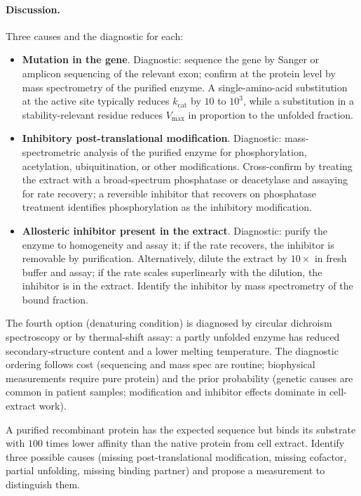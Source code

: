 \paragraph{Discussion.}
Three causes and the diagnostic for each:
\begin{itemize}[leftmargin=*]
\item \textbf{Mutation in the gene}. Diagnostic: sequence the gene by
  Sanger or amplicon sequencing of the relevant exon; confirm at the
  protein level by mass spectrometry of the purified enzyme. A
  single-amino-acid substitution at the active site typically
  reduces $k_{\text{cat}}$ by $10$ to $10^3$, while a substitution
  in a stability-relevant residue reduces $V_{\max}$ in proportion
  to the unfolded fraction.
\item \textbf{Inhibitory post-translational modification}. Diagnostic:
  mass-spectrometric analysis of the purified enzyme for
  phosphorylation, acetylation, ubiquitination, or other
  modifications. Cross-confirm by treating the extract with a
  broad-spectrum phosphatase or deacetylase and assaying for rate
  recovery; a reversible inhibitor that recovers on phosphatase
  treatment identifies phosphorylation as the inhibitory modification.
\item \textbf{Allosteric inhibitor present in the extract}.
  Diagnostic: purify the enzyme to homogeneity and assay it; if the
  rate recovers, the inhibitor is removable by purification.
  Alternatively, dilute the extract by $10\times$ in fresh buffer
  and assay; if the rate scales superlinearly with the dilution,
  the inhibitor is in the extract. Identify the inhibitor by mass
  spectrometry of the bound fraction.
\end{itemize}
The fourth option (denaturing condition) is diagnosed by circular
dichroism spectroscopy or by thermal-shift assay: a partly unfolded
enzyme has reduced secondary-structure content and a lower melting
temperature. The diagnostic ordering follows cost (sequencing and
mass spec are routine; biophysical measurements require pure protein)
and the prior probability (genetic causes are common in patient
samples; modification and inhibitor effects dominate in cell-extract
work).

\begin{exercise}
A purified recombinant protein has the expected sequence but binds
its substrate with $100$ times lower affinity than the native
protein from cell extract. Identify three possible causes (missing
post-translational modification, missing cofactor, partial
unfolding, missing binding partner) and propose a measurement to
distinguish them.
\end{exercise}

